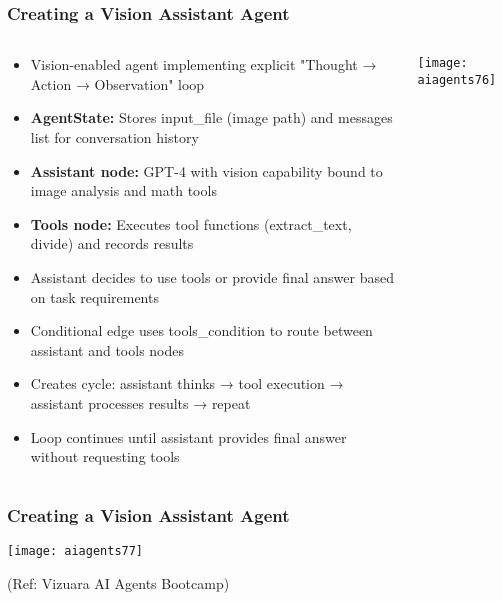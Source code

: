 \begin{frame}[fragile]\frametitle{Creating a Vision Assistant Agent}
\begin{columns}
    \begin{column}[T]{0.7\linewidth}
      \begin{itemize}
        \item Vision-enabled agent implementing explicit "Thought → Action → Observation" loop
        \item \textbf{AgentState:} Stores input\_file (image path) and messages list for conversation history
        \item \textbf{Assistant node:} GPT-4 with vision capability bound to image analysis and math tools
        \item \textbf{Tools node:} Executes tool functions (extract\_text, divide) and records results
        \item Assistant decides to use tools or provide final answer based on task requirements
        \item Conditional edge uses tools\_condition to route between assistant and tools nodes
        \item Creates cycle: assistant thinks → tool execution → assistant processes results → repeat
        \item Loop continues until assistant provides final answer without requesting tools
      \end{itemize}
    \end{column}
    \begin{column}[T]{0.3\linewidth}
        \begin{center}
        \texttt{[image: aiagents76]}
        \end{center}    
    \end{column}
  \end{columns}
\end{frame}

\begin{frame}[fragile]\frametitle{Creating a Vision Assistant Agent}

        \begin{center}

        \texttt{[image: aiagents77]}
		
		{\tiny (Ref: Vizuara AI Agents Bootcamp)}
				
        \end{center}    

\end{frame}

